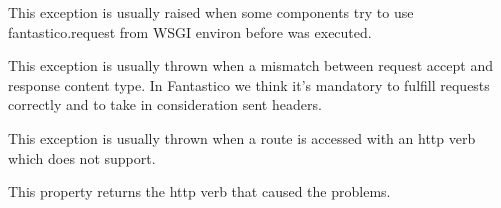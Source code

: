 \documentclass[letterpaper,10pt,english]{sphinxmanual}
\begin{document}

\begin{fulllineitems}
\label{features/exceptions:fantastico.exceptions.FantasticoNoRequestError}
This exception is usually raised when some components try to use fantastico.request from WSGI environ before
{\hyperref[features/request_response:fantastico.middleware.request_middleware.RequestMiddleware]{}} was executed.

\end{fulllineitems}


\begin{fulllineitems}
\label{features/exceptions:fantastico.exceptions.FantasticoContentTypeError}
This exception is usually thrown when a mismatch between request accept and response content type. In
Fantastico we think it's mandatory to fulfill requests correctly and to take in consideration sent headers.

\end{fulllineitems}


\begin{fulllineitems}
\label{features/exceptions:fantastico.exceptions.FantasticoHttpVerbNotSupported}
This exception is usually thrown when a route is accessed with an http verb which does not support.

\begin{fulllineitems}
\label{features/exceptions:fantastico.exceptions.FantasticoHttpVerbNotSupported.http_verb}
This property returns the http verb that caused the problems.

\end{fulllineitems}


\end{fulllineitems}
\end{document}
